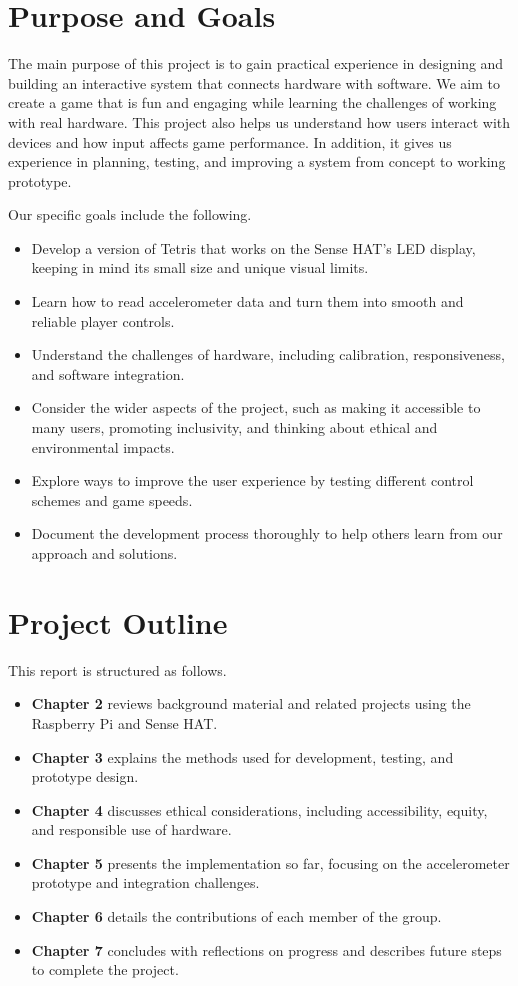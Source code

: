 \documentclass[11pt,titlepage,openright]{book}
\begin{document}
\section{Purpose and Goals}
\label{sec:purpose-goals}
The main purpose of this project is to gain practical experience in designing and building an interactive system that connects hardware with software. We aim to create a game that is fun and engaging while learning the challenges of working with real hardware. This project also helps us understand how users interact with devices and how input affects game performance. In addition, it gives us experience in planning, testing, and improving a system from concept to working prototype. 

Our specific goals include the following.

\begin{itemize}
\item Develop a version of Tetris that works on the Sense HAT’s LED display, keeping in mind its small size and unique visual limits.
\item Learn how to read accelerometer data and turn them into smooth and reliable player controls.
\item Understand the challenges of hardware, including calibration, responsiveness, and software integration.
\item Consider the wider aspects of the project, such as making it accessible to many users, promoting inclusivity, and thinking about ethical and environmental impacts.
\item Explore ways to improve the user experience by testing different control schemes and game speeds.
\item Document the development process thoroughly to help others learn from our approach and solutions.
\end{itemize}



\section{Project Outline}
\label{sec:thesis-outline}

This report is structured as follows.

\begin{itemize}
    \item \textbf{Chapter 2} reviews background material and related projects using the Raspberry Pi and Sense HAT.
    \item \textbf{Chapter 3} explains the methods used for development, testing, and prototype design.
    \item \textbf{Chapter 4} discusses ethical considerations, including accessibility, equity, and responsible use of hardware.
    \item \textbf{Chapter 5} presents the implementation so far, focusing on the accelerometer prototype and integration challenges.
    \item \textbf{Chapter 6} details the contributions of each member of the group.
    \item \textbf{Chapter 7} concludes with reflections on progress and describes future steps to complete the project.
\end{itemize}
\end{document}
